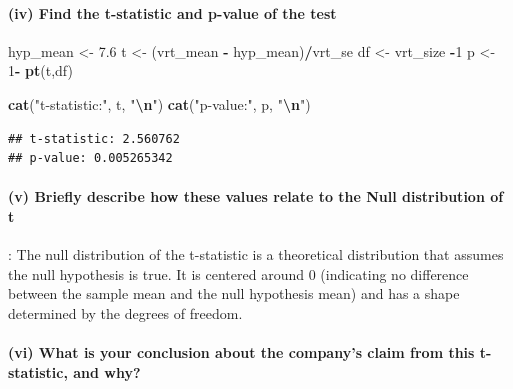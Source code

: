 \documentclass[
]{article}
\newenvironment{Shaded}{\begin{snugshade}}{\end{snugshade}}
\newcommand{\DecValTok}[1]{\textcolor[rgb]{0.00,0.00,0.81}{#1}}
\newcommand{\FloatTok}[1]{\textcolor[rgb]{0.00,0.00,0.81}{#1}}
\newcommand{\FunctionTok}[1]{\textcolor[rgb]{0.13,0.29,0.53}{\textbf{#1}}}
\newcommand{\NormalTok}[1]{#1}
\newcommand{\OtherTok}[1]{\textcolor[rgb]{0.56,0.35,0.01}{#1}}
\newcommand{\SpecialCharTok}[1]{\textcolor[rgb]{0.81,0.36,0.00}{\textbf{#1}}}
\newcommand{\StringTok}[1]{\textcolor[rgb]{0.31,0.60,0.02}{#1}}
\begin{document}
\hypertarget{iv-find-the-t-statistic-and-p-value-of-the-test}{%
\paragraph{(iv) Find the t-statistic and p-value of the
test}\label{iv-find-the-t-statistic-and-p-value-of-the-test}}

\begin{Shaded}
\begin{Highlighting}[]
\NormalTok{hyp\_mean }\OtherTok{\textless{}{-}} \FloatTok{7.6} 
\NormalTok{t }\OtherTok{\textless{}{-}}\NormalTok{ (vrt\_mean }\SpecialCharTok{{-}}\NormalTok{ hyp\_mean)}\SpecialCharTok{/}\NormalTok{vrt\_se}
\NormalTok{df }\OtherTok{\textless{}{-}}\NormalTok{ vrt\_size }\SpecialCharTok{{-}}\DecValTok{1}
\NormalTok{p }\OtherTok{\textless{}{-}} \DecValTok{1}\SpecialCharTok{{-}} \FunctionTok{pt}\NormalTok{(t,df)}

\FunctionTok{cat}\NormalTok{(}\StringTok{"t{-}statistic:"}\NormalTok{, t, }\StringTok{"}\SpecialCharTok{\textbackslash{}n}\StringTok{"}\NormalTok{)}
\FunctionTok{cat}\NormalTok{(}\StringTok{"p{-}value:"}\NormalTok{, p, }\StringTok{"}\SpecialCharTok{\textbackslash{}n}\StringTok{"}\NormalTok{)}
\end{Highlighting}
\end{Shaded}

\begin{verbatim}
## t-statistic: 2.560762 
## p-value: 0.005265342
\end{verbatim}

\hypertarget{v-briefly-describe-how-these-values-relate-to-the-null-distribution-of-t}{%
\paragraph{(v) Briefly describe how these values relate to the Null
distribution of
t}\label{v-briefly-describe-how-these-values-relate-to-the-null-distribution-of-t}}

: The null distribution of the t-statistic is a theoretical distribution
that assumes the null hypothesis is true. It is centered around 0
(indicating no difference between the sample mean and the null
hypothesis mean) and has a shape determined by the degrees of freedom.

\hypertarget{vi-what-is-your-conclusion-about-the-companys-claim-from-this-t-statistic-and-why}{%
\paragraph{(vi) What is your conclusion about the company's claim from
this t-statistic, and
why?}\label{vi-what-is-your-conclusion-about-the-companys-claim-from-this-t-statistic-and-why}}
\end{document}
